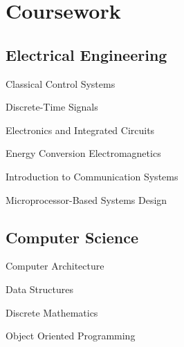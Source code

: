 \documentclass[]{wow}
\begin{document}
\begin{minipage}[t]{0.34\textwidth}

\section{Coursework}
\subsection{Electrical Engineering}
\vspace{0.7em} %
\begin{tightemize}
\scriptsize{}
	\item Classical Control Systems    
    \item Discrete-Time Signals
    \item Electronics and Integrated Circuits
    \item Energy Conversion Electromagnetics 
    \item Introduction to Communication Systems 
    \item Microprocessor-Based Systems Design
\end{tightemize}

\subsection{Computer Science}
\vspace{0.4em} %
\begin{tightemize}
\scriptsize{}
    \vspace{0.7em} %
    \item Computer Architecture
    \item Data Structures
    \item Discrete Mathematics
    \item Object Oriented Programming
\end{tightemize}


\end{minipage}
\end{document}
